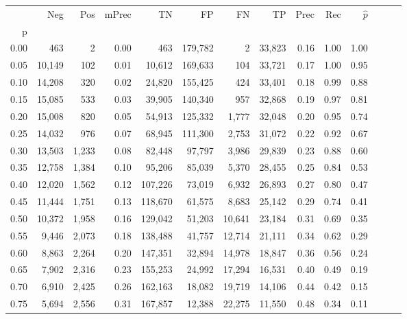 \begin{tabular}{rrrrrrrrrrrrrr}
\toprule
{} &     Neg &    Pos & mPrec &       TN &       FP &      FN &      TP &  Prec &   Rec & $\hat{p}$ \\
p    &         &        &       &          &          &         &         &       &       &           \\
\midrule
0.00 &     463 &      2 &  0.00 &      463 &  179,782 &       2 &  33,823 &  0.16 &  1.00 &      1.00 \\
0.05 &  10,149 &    102 &  0.01 &   10,612 &  169,633 &     104 &  33,721 &  0.17 &  1.00 &      0.95 \\
0.10 &  14,208 &    320 &  0.02 &   24,820 &  155,425 &     424 &  33,401 &  0.18 &  0.99 &      0.88 \\
0.15 &  15,085 &    533 &  0.03 &   39,905 &  140,340 &     957 &  32,868 &  0.19 &  0.97 &      0.81 \\
0.20 &  15,008 &    820 &  0.05 &   54,913 &  125,332 &   1,777 &  32,048 &  0.20 &  0.95 &      0.74 \\
0.25 &  14,032 &    976 &  0.07 &   68,945 &  111,300 &   2,753 &  31,072 &  0.22 &  0.92 &      0.67 \\
0.30 &  13,503 &  1,233 &  0.08 &   82,448 &   97,797 &   3,986 &  29,839 &  0.23 &  0.88 &      0.60 \\
0.35 &  12,758 &  1,384 &  0.10 &   95,206 &   85,039 &   5,370 &  28,455 &  0.25 &  0.84 &      0.53 \\
0.40 &  12,020 &  1,562 &  0.12 &  107,226 &   73,019 &   6,932 &  26,893 &  0.27 &  0.80 &      0.47 \\
0.45 &  11,444 &  1,751 &  0.13 &  118,670 &   61,575 &   8,683 &  25,142 &  0.29 &  0.74 &      0.41 \\
0.50 &  10,372 &  1,958 &  0.16 &  129,042 &   51,203 &  10,641 &  23,184 &  0.31 &  0.69 &      0.35 \\
0.55 &   9,446 &  2,073 &  0.18 &  138,488 &   41,757 &  12,714 &  21,111 &  0.34 &  0.62 &      0.29 \\
0.60 &   8,863 &  2,264 &  0.20 &  147,351 &   32,894 &  14,978 &  18,847 &  0.36 &  0.56 &      0.24 \\
0.65 &   7,902 &  2,316 &  0.23 &  155,253 &   24,992 &  17,294 &  16,531 &  0.40 &  0.49 &      0.19 \\
0.70 &   6,910 &  2,425 &  0.26 &  162,163 &   18,082 &  19,719 &  14,106 &  0.44 &  0.42 &      0.15 \\
0.75 &   5,694 &  2,556 &  0.31 &  167,857 &   12,388 &  22,275 &  11,550 &  0.48 &  0.34 &      0.11 \\

\end{tabular}
